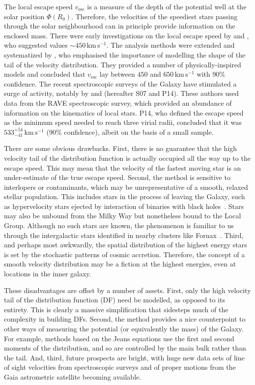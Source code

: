 \documentclass[useAMS,twocolumn,usenatbib]{mn2e}
\def\kms{{\,\mathrm{km\,s^{-1}}}}
\def\vesc{{v_\mathrm{esc}}}
\begin{document}
The local escape speed $\vesc$ is a measure of the depth of the potential well at the solar position $\Phi(R_0)$. 
Therefore, the velocities of the speediest stars passing through the solar neighbourhood can in principle provide information on the enclosed mass. 
There were early investigations on the local escape speed by \citet{Ca81} and \citet{Al82}, who suggested values $\sim 450\kms$.
The analysis methods were extended and systematized by \citet{Le90}, who emphasised the importance of modelling the shape of the tail of the velocity distribution. 
They provided a number of physically-inspired models and concluded that $\vesc$ lay between $450$ and $650 \kms$ with 90\% confidence. 
The recent spectroscopic surveys of the Galaxy have stimulated a surge of activity, notably by \cite{Sm07} and \cite{Pi14} (hereafter S07 and P14).
These authors used data from the RAVE spectroscopic survey, which provided an abundance of information on the kinematics of local stars. 
P14, who defined the escape speed as the minimum speed needed to reach three virial radii, concluded that it was $533^{+54}_{-41} \kms$ (90\% confidence), albeit on the basis of a small sample.

There are some obvious drawbacks.
First, there is no guarantee that the high velocity tail of the distribution function is actually occupied all the way up to the escape speed. 
This may mean that the velocity of the fastest moving star is an under-estimate of the true escape speed. 
Second, the method is sensitive to interlopers or contaminants, which may be unrepresentative of a smooth, relaxed stellar population. 
This includes stars in the process of leaving the Galaxy, such as hypervelocity stars ejected by interaction of binaries with black holes~\citep[e.g.,][]{Br15,Bou16}. 
Stars may also be unbound from the Milky Way but nonetheless bound to the Local Group. 
Although no such stars are known, the phenomenon is familiar to us through the intergalactic stars identified in nearby clusters like Fornax~\citep{Th97}. 
Third, and perhaps most awkwardly, the spatial distribution of the highest energy stars is set by the stochastic patterns of cosmic accretion. 
Therefore, the concept of a smooth velocity distribution may be a fiction at the highest energies, even at locations in the inner galaxy.

These disadvantages are offset by a number of assets. First, only the high velocity tail of the distribution function (DF) need be modelled, as opposed to its entirety. 
This is clearly a massive simplification that sidesteps much of the complexity in building DFs. 
Second, the method provides a nice counterpoint to other ways of measuring the potential (or equivalently the mass) of the Galaxy. 
For example, methods based on the Jeans equations use the first and second moments of the distribution, and so are controlled by the main bulk rather than the tail. 
And, third, future prospects are bright, with huge new data sets of line of sight velocities from spectroscopic surveys and of proper motions from the Gaia astrometric satellite becoming available.
\end{document}
